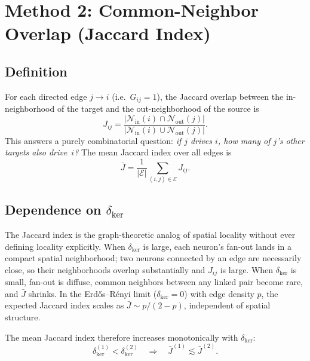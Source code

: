 \documentclass[11pt]{article}
\begin{document}
\section{Method 2: Common-Neighbor Overlap (Jaccard Index)}
\label{sec:jaccard}

\subsection{Definition}

For each directed edge $j\to i$ (i.e.\ $G_{ij}=1$), the Jaccard
overlap between the in-neighborhood of the target and the
out-neighborhood of the source is
\begin{equation}
  J_{ij}
  = \frac{|\mathcal{N}_{\mathrm{in}}(i)
          \cap \mathcal{N}_{\mathrm{out}}(j)|}
         {|\mathcal{N}_{\mathrm{in}}(i)
          \cup \mathcal{N}_{\mathrm{out}}(j)|}.
  \label{eq:jaccard}
\end{equation}
This answers a purely combinatorial question: \emph{if $j$ drives $i$,
how many of $j$'s other targets also drive~$i$?}  The mean Jaccard
index over all edges is
\begin{equation}
  \bar{J}
  = \frac{1}{|\mathcal{E}|}
    \sum_{(i,j)\in\mathcal{E}} J_{ij}.
  \label{eq:jaccard_mean}
\end{equation}

\subsection{Dependence on $\delta_{\mathrm{ker}}$}

The Jaccard index is the graph-theoretic analog of spatial locality
without ever defining locality explicitly.  When
$\delta_{\mathrm{ker}}$ is large, each neuron's fan-out lands in a
compact spatial neighborhood; two neurons connected by an edge are
necessarily close, so their neighborhoods overlap substantially and
$J_{ij}$ is large.  When $\delta_{\mathrm{ker}}$ is small, fan-out is
diffuse, common neighbors between any linked pair become rare, and
$\bar{J}$ shrinks.  In the Erd\H{o}s--R\'enyi limit
($\delta_{\mathrm{ker}}=0$) with edge density $p$, the expected
Jaccard index scales as $\bar{J}\sim p/(2-p)$, independent of
spatial structure.

The mean Jaccard index therefore increases monotonically with
$\delta_{\mathrm{ker}}$:
\begin{equation}
  \delta_{\mathrm{ker}}^{(1)} < \delta_{\mathrm{ker}}^{(2)}
  \quad\Longrightarrow\quad
  \bar{J}^{(1)} \lesssim \bar{J}^{(2)}.
  \label{eq:J_monotone}
\end{equation}
\end{document}
